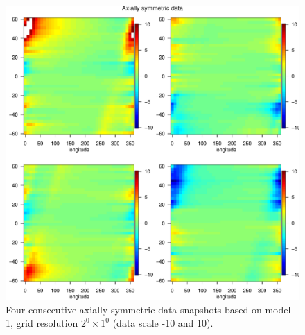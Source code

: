 % 
% 

\begin{figure}[H]
\label{grid_plot_model1}
\begin{center}
\includegraphics [scale=.8]{graphs/Data_sample_120_model1.pdf}
\caption*{Four consecutive axially symmetric data snapshots based on model 1, grid resolution $2^0\times 1^0$ (data scale -10 and 10).}
\end{center}
\end{figure}

